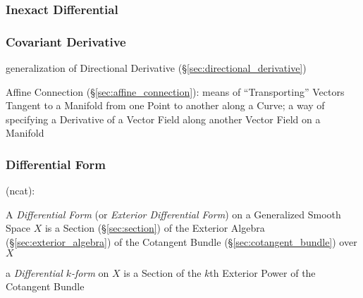 \subsubsection{Inexact Differential}\label{sec:inexact_differential}

\subsubsection{Covariant Derivative}\label{sec:covariant_derivative}

generalization of Directional Derivative (\S\ref{sec:directional_derivative})

\fist Affine Connection (\S\ref{sec:affine_connection}): means of
``Transporting'' Vectors Tangent to a Manifold from one Point to another along
a Curve; a way of specifying a Derivative of a Vector Field along another
Vector Field on a Manifold



\subsubsection{Differential Form}\label{sec:differential_form}

(ncat):

A \emph{Differential Form} (or \emph{Exterior Differential Form}) on a
Generalized Smooth Space $X$ is a Section (\S\ref{sec:section}) of the Exterior
Algebra (\S\ref{sec:exterior_algebra}) of the Cotangent Bundle
(\S\ref{sec:cotangent_bundle}) over $X$

a \emph{Differential $k$-form} on $X$ is a Section of the $k$th Exterior Power
of the Cotangent Bundle

